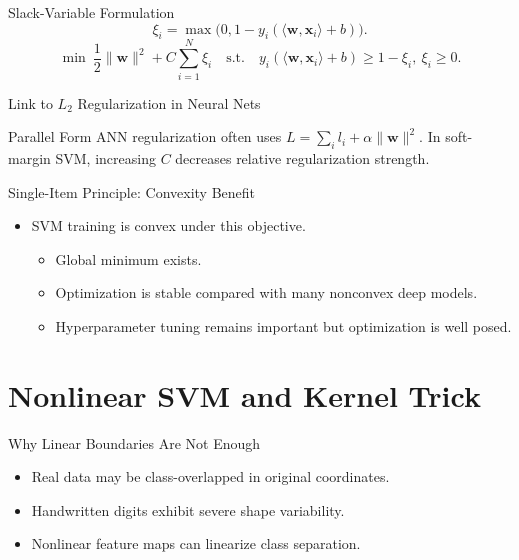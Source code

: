 \documentclass[10pt]{beamer}
\begin{document}
\begin{frame}{Slack-Variable Formulation}
  \justifying
  \[
    \xi_i = \max\bigl(0,1-y_i(\langle\bm{w},\bm{x}_i\rangle+b)\bigr).
  \]
  \[
    \min\ \frac{1}{2}\|\bm{w}\|^2 + C\sum_{i=1}^N\xi_i
    \quad \text{s.t.}\quad
    y_i(\langle\bm{w},\bm{x}_i\rangle+b)\ge 1-\xi_i,\ \xi_i\ge 0.
  \]
\end{frame}

\begin{frame}{Link to $L_2$ Regularization in Neural Nets}
  \justifying
  \begin{examplebox}{Parallel Form}
    ANN regularization often uses
    \(
      L=\sum_i l_i + \alpha\|\bm{w}\|^2
    \).
    In soft-margin SVM, increasing $C$ decreases relative regularization strength.
  \end{examplebox}
\end{frame}

\begin{frame}{Single-Item Principle: Convexity Benefit}
  \justifying
  \begin{itemize}
    \item SVM training is convex under this objective.
    \begin{itemize}
      \item Global minimum exists.
      \item Optimization is stable compared with many nonconvex deep models.
      \item Hyperparameter tuning remains important but optimization is well posed.
    \end{itemize}
  \end{itemize}
\end{frame}

\section{Nonlinear SVM and Kernel Trick}

\begin{frame}{Why Linear Boundaries Are Not Enough}
  \justifying
  \begin{itemize}
    \item Real data may be class-overlapped in original coordinates.
    \item Handwritten digits exhibit severe shape variability.
    \item Nonlinear feature maps can linearize class separation.
  \end{itemize}
\end{frame}
\end{document}
